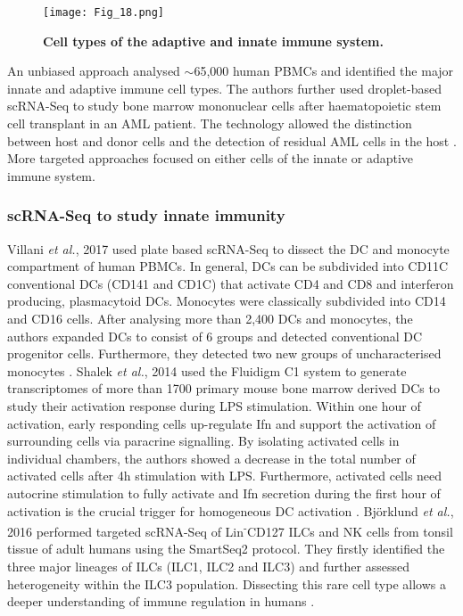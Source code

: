 \begin{figure}[!h]
\centering
\texttt{[image: Fig\_18.png]}
\caption[Cell types of the adaptive and innate immune system]{\textbf{Cell types of the adaptive and innate immune system.}}
\label{fig0:immune_system}
\end{figure}

An unbiased approach analysed $\sim$65,000 human \glspl{PBMC} and identified the major innate and adaptive immune cell types. The authors further used droplet-based scRNA-Seq to study bone marrow mononuclear cells after haematopoietic stem cell transplant in an \gls{AML} patient. The technology allowed the distinction between host and donor cells and the detection of residual AML cells in the host \citep{Zheng2017}. \\

More targeted approaches focused on either cells of the innate or adaptive immune system.

\subsubsection{scRNA-Seq to study innate immunity}

Villani \emph{et al.}, 2017 used plate based scRNA-Seq to dissect the \gls{DC} and monocyte compartment of human \glspl{PBMC}. In general, DCs can be subdivided into CD11C\plus{} conventional DCs (CD141\plus{} and CD1C\plus{}) that activate CD4\plus{} and CD8\plus{} and interferon producing, plasmacytoid DCs. Monocytes were classically subdivided into CD14\plus{} and CD16\plus{} cells. After analysing more than 2,400 DCs and monocytes, the authors expanded DCs to consist of 6 groups and detected conventional DC progenitor cells. Furthermore, they detected two new groups of uncharacterised monocytes \citep{Villani2017}. Shalek \emph{et al.}, 2014 used the Fluidigm C1 system to generate transcriptomes of more than 1700 primary mouse bone marrow derived DCs to study their activation response during \gls{LPS} stimulation. Within one hour of activation, early responding cells up-regulate \gls{Ifn}\textbeta{} and support the activation of surrounding cells via paracrine signalling. By isolating activated cells in individual chambers, the authors showed a decrease in the total number of activated cells after 4h stimulation with LPS. Furthermore, activated cells need autocrine stimulation to fully activate and Ifn\textbeta{} secretion during the first hour of activation is the crucial trigger for homogeneous DC activation \citep{Shalek2014}. Bj\"o{}rklund \emph{et al.}, 2016 performed targeted scRNA-Seq of Lin\textsuperscript{-}CD127\plus{} \glspl{ILC} and NK cells from tonsil tissue of adult humans using the SmartSeq2 protocol. They firstly identified the three major lineages of ILCs (ILC1, ILC2 and ILC3) and further assessed heterogeneity within the ILC3 population. Dissecting this rare cell type allows a deeper understanding of immune regulation in humans \citep{Bjorklund2016}. 

